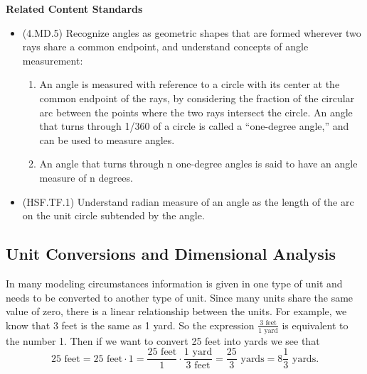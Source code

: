 \documentclass[
]{book}
\providecommand{\tightlist}{%
  \setlength{\itemsep}{0pt}\setlength{\parskip}{0pt}}
\newenvironment{standards}{}{}
\theoremstyle{definition}
\theoremstyle{definition}
\theoremstyle{definition}
\theoremstyle{definition}
\theoremstyle{remark}
\begin{document}
\begin{standards}

\begin{center}
\textbf{Related Content Standards}

\end{center}

\begin{itemize}
\tightlist
\item
  (4.MD.5) Recognize angles as geometric shapes that are formed wherever two rays share a common endpoint, and understand concepts of angle measurement:

  \begin{enumerate}
  \def\labelenumi{\alph{enumi}.}
  \tightlist
  \item
    An angle is measured with reference to a circle with its center at the common endpoint of the rays, by considering the fraction of the circular arc between the points where the two rays intersect the circle. An angle that turns through 1/360 of a circle is called a ``one-degree angle,'' and can be used to measure angles.
  \item
    An angle that turns through n one-degree angles is said to have an angle measure of n degrees.
  \end{enumerate}
\item
  (HSF.TF.1) Understand radian measure of an angle as the length of the arc on the unit circle subtended by the angle.
\end{itemize}

\end{standards}

\hypertarget{unit-conversions-and-dimensional-analysis}{%
\subsection{Unit Conversions and Dimensional Analysis}\label{unit-conversions-and-dimensional-analysis}}

In many modeling circumstances information is given in one type of unit and needs to be converted to another type of unit. Since many units share the same value of zero, there is a linear relationship between the units. For example, we know that 3 feet is the same as 1 yard. So the expression \(\frac{3 \mbox{ feet}}{1 \mbox{ yard}}\) is equivalent to the number 1. Then if we want to convert 25 feet into yards we see that
\[25 \mbox{ feet} = 25 \mbox{ feet} \cdot 1 = \frac{25 \mbox{ feet}}{1} \cdot \frac{1 \mbox{ yard}}{3 \mbox{ feet}} = \frac{25}{3} \mbox{ yards} = 8 \frac{1}{3} \mbox{ yards}.\]
\end{document}

